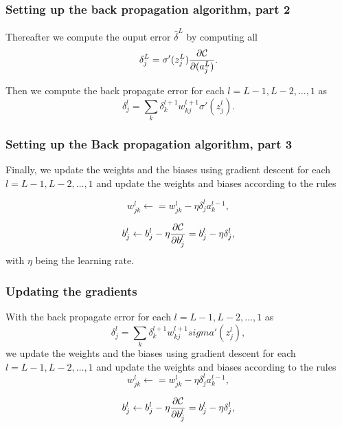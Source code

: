 \documentclass{beamer}
\begin{document}
\begin{frame}
\frametitle{Setting up the back propagation algorithm, part 2}

Thereafter we compute the ouput error $\hat{\delta}^L$ by computing all
\[
\delta_j^L = \sigma'(z_j^L)\frac{\partial {\cal C}}{\partial (a_j^L)}.
\]

Then we compute the back propagate error for each $l=L-1,L-2,\dots,1$ as
\[
\delta_j^l = \sum_k \delta_k^{l+1}w_{kj}^{l+1}\sigma'(z_j^l).
\]
\end{frame}

\begin{frame}
\frametitle{Setting up the Back propagation algorithm, part 3}

Finally, we update the weights and the biases using gradient descent
for each $l=L-1,L-2,\dots,1$ and update the weights and biases
according to the rules

\[
w_{jk}^l\leftarrow  = w_{jk}^l- \eta \delta_j^la_k^{l-1},
\]

\[
b_j^l \leftarrow b_j^l-\eta \frac{\partial {\cal C}}{\partial b_j^l}=b_j^l-\eta \delta_j^l,
\]
with $\eta$ being the learning rate.
\end{frame}

\begin{frame}
\frametitle{Updating the gradients}

With the back propagate error for each $l=L-1,L-2,\dots,1$ as
\[
\delta_j^l = \sum_k \delta_k^{l+1}w_{kj}^{l+1}sigma'(z_j^l),
\]
we update the weights and the biases using gradient descent for each $l=L-1,L-2,\dots,1$ and update the weights and biases according to the rules
\[
w_{jk}^l\leftarrow  = w_{jk}^l- \eta \delta_j^la_k^{l-1},
\]

\[
b_j^l \leftarrow b_j^l-\eta \frac{\partial {\cal C}}{\partial b_j^l}=b_j^l-\eta \delta_j^l,
\]
\end{frame}
\end{document}
